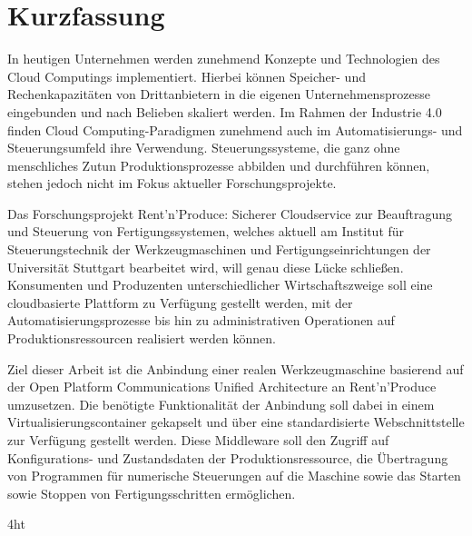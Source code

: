 \documentclass[
a4paper,
twoside,
headsepline,
cleardoublepage=empty,
parskip=half,
draft=false
]{scrbook}
\begin{document}
	\newpage

	\section*{Kurzfassung}

		In heutigen Unternehmen werden zunehmend Konzepte und Technologien des Cloud Computings implementiert. 
		Hierbei können Speicher- und Rechenkapazitäten von Drittanbietern in die eigenen Unternehmensprozesse eingebunden und nach Belieben skaliert werden. 
		Im Rahmen der Industrie 4.0 finden Cloud Computing-Paradigmen zunehmend auch im Automatisierungs- und Steuerungsumfeld ihre Verwendung. Steuerungssysteme, die ganz ohne menschliches Zutun Produktionsprozesse abbilden und durchführen können, stehen jedoch nicht im Fokus aktueller Forschungsprojekte.

		Das Forschungsprojekt \glqq Rent'n'Produce: Sicherer Cloudservice zur Beauftragung und Steuerung von Fertigungssystemen\grqq{}, welches aktuell am Institut für Steuerungstechnik der Werkzeugmaschinen und Fertigungseinrichtungen der Universität Stuttgart bearbeitet wird, will genau diese Lücke schließen.
		Konsumenten und Produzenten unterschiedlicher Wirtschaftszweige soll eine cloudbasierte Plattform zu Verfügung gestellt werden, mit der Automatisierungsprozesse bis hin zu administrativen Operationen auf Produktionsressourcen realisiert werden können.

		Ziel dieser Arbeit ist die Anbindung einer realen Werkzeugmaschine basierend auf der Open Platform Communications Unified Architecture an Rent'n'Produce umzusetzen.
		Die benötigte Funktionalität der Anbindung soll dabei in einem Virtualisierungscontainer gekapselt und über eine standardisierte Webschnittstelle zur Verfügung gestellt werden.
		Diese Middleware soll den Zugriff auf Konfigurations- und Zustandsdaten der Produktionsressource, die Übertragung von Programmen für numerische Steuerungen auf die Maschine sowie das Starten sowie Stoppen von Fertigungsschritten ermöglichen.

	\cleardoublepage


	\iftex4ht
	\else
	\fi

\end{document}
